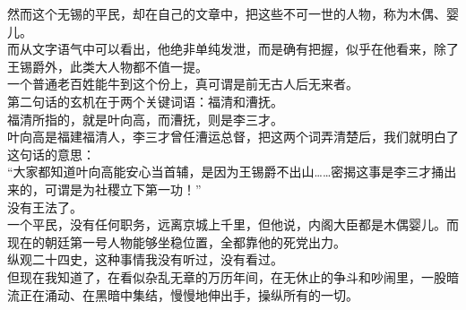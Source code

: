 \begin{multicols}{\theparacolNo}
然而这个无锡的平民，却在自己的文章中，把这些不可一世的人物，称为木偶、婴儿。\\

而从文字语气中可以看出，他绝非单纯发泄，而是确有把握，似乎在他看来，除了王锡爵外，此类大人物都不值一提。\\

一个普通老百姓能牛到这个份上，真可谓是前无古人后无来者。\\

第二句话的玄机在于两个关键词语：福清和漕抚。\\

福清所指的，就是叶向高，而漕抚，则是李三才。\\

叶向高是福建福清人，李三才曾任漕运总督，把这两个词弄清楚后，我们就明白了这句话的意思：\\

“大家都知道叶向高能安心当首辅，是因为王锡爵不出山……密揭这事是李三才捅出来的，可谓是为社稷立下第一功！”\\

没有王法了。\\

一个平民，没有任何职务，远离京城上千里，但他说，内阁大臣都是木偶婴儿。而现在的朝廷第一号人物能够坐稳位置，全都靠他的死党出力。\\

纵观二十四史，这种事情我没有听过，没有看过。\\

但现在我知道了，在看似杂乱无章的万历年间，在无休止的争斗和吵闹里，一股暗流正在涌动、在黑暗中集结，慢慢地伸出手，操纵所有的一切。\\
\ifnum{}
	\end{multicols}
\fi
\newpage
